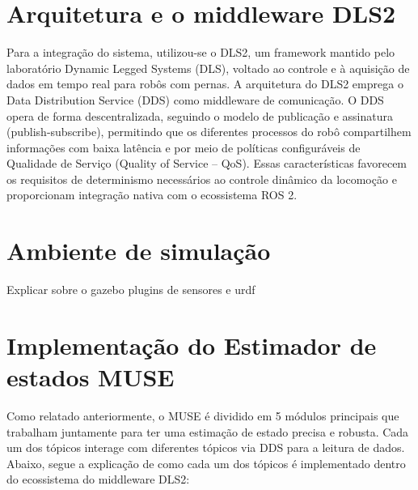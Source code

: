 \section{Arquitetura e o middleware DLS2}
Para a integração do sistema, utilizou-se o DLS2, um framework mantido pelo laboratório Dynamic Legged Systems (DLS), voltado ao controle e à aquisição de dados em tempo real para robôs com pernas. A arquitetura do DLS2 emprega o Data Distribution Service (DDS) como middleware de comunicação. O DDS opera de forma descentralizada, seguindo o modelo de publicação e assinatura (publish-subscribe), permitindo que os diferentes processos do robô compartilhem informações com baixa latência e por meio de políticas configuráveis de Qualidade de Serviço (Quality of Service – QoS). Essas características favorecem os requisitos de determinismo necessários ao controle dinâmico da locomoção e proporcionam integração nativa com o ecossistema ROS 2.

\section{Ambiente de simulação}

Explicar sobre o gazebo plugins de sensores e urdf

\section{Implementação do Estimador de estados MUSE}
Como relatado anteriormente, o MUSE é dividido em 5 módulos principais que trabalham juntamente para ter uma estimação de estado precisa e robusta. Cada um dos tópicos interage com diferentes tópicos via DDS para a leitura de dados. Abaixo, segue a explicação de como cada um dos tópicos é implementado dentro do ecossistema do middleware DLS2:

